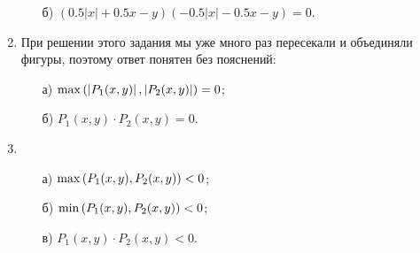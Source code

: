 \begin{enumerate}
\begin{enumerate}
	\item[б)] $(0.5 |x| + 0.5 x - y)(- 0.5 |x| - 0.5 x - y) = 0.$
\end{enumerate}

\item При решении этого задания мы уже много раз пересекали и объединяли фигуры, поэтому ответ понятен без пояснений:

\begin{enumerate}
	\item[а)] $\max \left( \left| P_1 (x,y) \right|, \left| P_2 (x,y) \right|\right) = 0$;
	\item[б)] $P_1(x,y) \cdot P_2(x,y) = 0$.
\end{enumerate}

\item \begin{enumerate}
	\item[а)] $\max \left( P_1(x,y), P_2(x,y) \right) < 0$; 
	\item[б)] $\min \left( P_1(x,y), P_2(x,y) \right) < 0$;
	\item[в)] $P_1(x,y) \cdot P_2(x,y) < 0$.
\end{enumerate}

\end{enumerate}